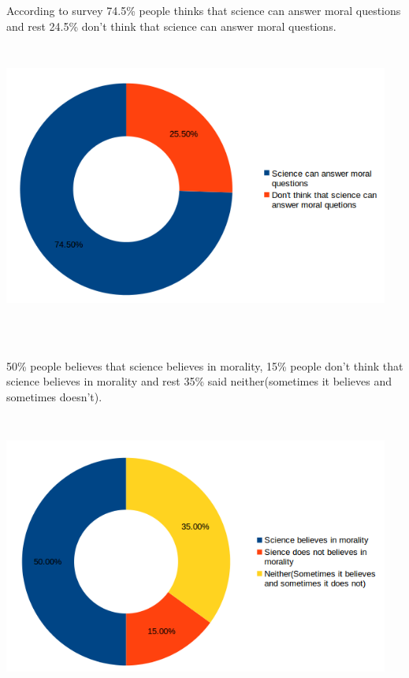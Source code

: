 \documentclass[12pt]{report}
\begin{document}
\subsubsection{} According to survey 74.5\% people thinks that science can answer moral questions and rest 24.5\% don't think that science can answer moral questions.
\\

\includegraphics[width=5in,height=4in]{2.png}
\newpage
\LARGE

\subsubsection{} 50\% people believes that science believes in morality, 15\% people don't think that science believes in morality and rest 35\% said neither(sometimes it believes and sometimes doesn't).
\\

\includegraphics[width=5in,height=4in]{3.png}
\newpage
\LARGE
\end{document}
